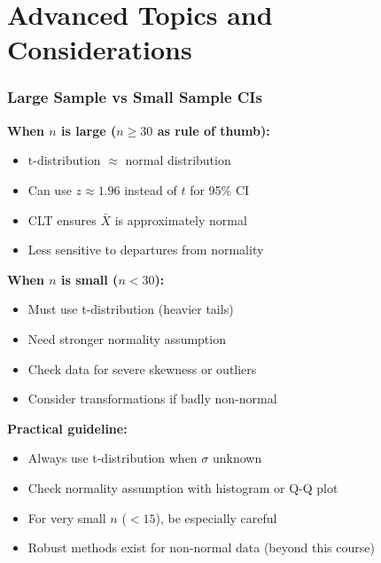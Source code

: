 \documentclass{beamer}
\begin{document}
\section{Advanced Topics and Considerations}

\begin{frame}
\frametitle{Large Sample vs Small Sample CIs}
\textbf{When $n$ is large ($n \geq 30$ as rule of thumb):}
\begin{itemize}
\item t-distribution $\approx$ normal distribution
\item Can use $z \approx 1.96$ instead of $t$ for 95\% CI
\item CLT ensures $\bar{X}$ is approximately normal
\item Less sensitive to departures from normality
\end{itemize}

\vspace{0.5cm}
\textbf{When $n$ is small ($n < 30$):}
\begin{itemize}
\item Must use t-distribution (heavier tails)
\item Need stronger normality assumption
\item Check data for severe skewness or outliers
\item Consider transformations if badly non-normal
\end{itemize}

\vspace{0.5cm}
\textbf{Practical guideline:}
\begin{itemize}
\item Always use t-distribution when $\sigma$ unknown
\item Check normality assumption with histogram or Q-Q plot
\item For very small $n$ ($< 15$), be especially careful
\item Robust methods exist for non-normal data (beyond this course)
\end{itemize}
\end{frame}
\end{document}
